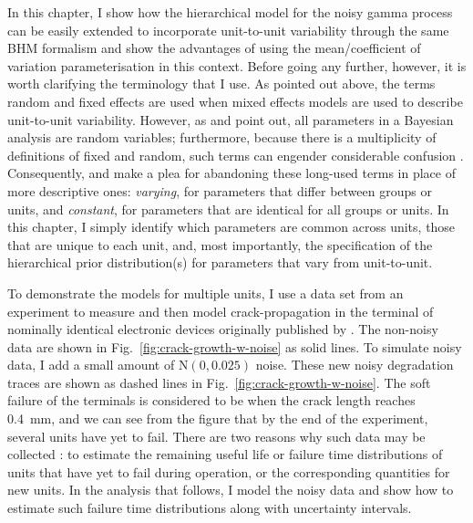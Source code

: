 In this chapter, I show how the hierarchical model for the noisy gamma process can be easily extended to incorporate unit-to-unit variability through the same BHM formalism and show the advantages of using the mean/coefficient of variation parameterisation in this context. Before going any further, however, it is worth clarifying the terminology that I use. As pointed out above, the terms random and fixed effects are used when mixed effects models are used to describe unit-to-unit variability. However, as \citet{Gelman2005} and \citet{gelman2006} point out, all parameters in a Bayesian analysis are random variables; furthermore, because there is a multiplicity of definitions of fixed and random, such terms can engender considerable confusion \citep[Section~6]{Gelman2005}. Consequently, \citet{Gelman2005} and \citet{gelman2006} make a plea for abandoning these long-used terms in place of more descriptive ones: \emph{varying}, for parameters that differ between groups or units, and \emph{constant}, for parameters that are identical for all groups or units. In this chapter, I simply identify which parameters are common across units, those that are unique to each unit, and, most importantly, the specification of the hierarchical prior distribution(s) for parameters that vary from unit-to-unit.

To demonstrate the models for multiple units, I use a data set from an experiment to measure and then model crack-propagation in the terminal of nominally identical electronic devices originally published by \citet{rodriguez-picon2018}. The non-noisy data are shown in Fig.~\ref{fig:crack-growth-w-noise} as solid lines. To simulate noisy data, I add a small amount of $\mathrm{N}(0, 0.025)$ noise. These new noisy degradation traces are shown as dashed lines in Fig.~\ref{fig:crack-growth-w-noise}. The soft failure of the terminals is considered to be when the crack length reaches 0.4~mm, and we can see from the figure that by the end of the experiment, several units have yet to fail. There are two reasons why such data may be collected \citep{robinson2000}: to estimate the remaining useful life or failure time distributions of units that have yet to fail during operation, or the corresponding quantities for new units. In the analysis that follows, I model the noisy data and show how to estimate such failure time distributions along with uncertainty intervals.

